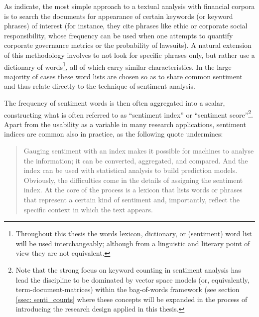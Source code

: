 As \textcite{LM-meta-2016} indicate, the most simple approach to a textual analysis with financial corpora is to search the documents for appearance of certain keywords (or keyword phrases) of interest (for instance, they cite phrases like \textsf{ethic} or \textsf{corporate social responsibility}, whose frequency can be used when one attempts to quantify corporate governance metrics or the probability of lawsuits). A natural extension of this methodology involves to not look for specific phrases only, but rather use a dictionary of words\footnote{Throughout this thesis the words lexicon, dictionary, or (sentiment) word list will be used interchangeably; although from a linguistic and literary point of view they are not equivalent.}, all of which carry similar characteristics. In the large majority of cases these word lists are chosen so as to share common sentiment and thus relate directly to the technique of sentiment analysis. 

The frequency of sentiment words is then often aggregated into a scalar, constructing what is often referred to as \enquote{sentiment index} or \enquote{sentiment score}\footnote{Note that the strong focus on keyword counting in sentiment analysis has lead the discipline to be dominated by vector space models (or, equivalently, term-document-matrices) within the bag-of-words framework (see section \ref{ssec: senti_counts} where these concepts will be expanded in the process of introducing the research design applied in this thesis.}. Apart from the usability as a variable in many research applications, sentiment indices are common also in practice, as the following quote undermines:
\blockquote[\textcite{McKinsey_2013}]{Gauging sentiment with an index makes it possible for machines to analyse the information; it can be converted, aggregated, and compared. And the index can be used with statistical analysis to build prediction models. Obviously, the difficulties come in the details of assigning the sentiment index. At the core of the process is a lexicon that lists words or phrases that represent a certain kind of sentiment and, importantly, reflect the specific context in which the text appears.}

